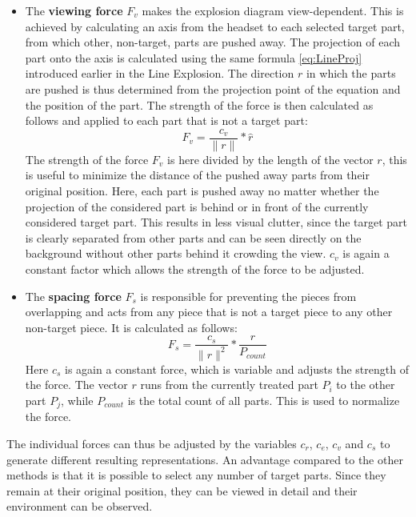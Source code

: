 \begin{itemize}
	\item The \textbf{viewing force} $F_v$ makes the explosion diagram view-dependent. 
	This is achieved by calculating an axis from the headset to each selected target part, from which other, non-target, parts are pushed away. 
	The projection of each part onto the axis is calculated using the same formula \ref{eq:LineProj} introduced earlier in the Line Explosion.
	The direction $r$ in which the parts are pushed is thus determined from the projection point of the equation and the position of the part. 
	The strength of the force is then calculated as follows and applied to each part that is not a target part:
	\begin{equation}
		F_v = \frac{c_v}{\|r\|} * \hat{r}
		\label{eq:FB_viewingForce}
	\end{equation}
	The strength of the force $F_v$ is here divided by the length of the vector $r$, this is useful to minimize the distance of the pushed away parts from their original position. 
	Here, each part is pushed away no matter whether the projection of the considered part is behind or in front of the currently considered target part. 
	This results in less visual clutter, since the target part is clearly separated from other parts and can be seen directly on the background without other parts behind it crowding the view. 
	$c_v$ is again a constant factor which allows the strength of the force to be adjusted.
	\item The \textbf{spacing force} $F_s$ is responsible for preventing the pieces from overlapping and acts from any piece that is not a target piece to any other non-target piece. It is calculated as follows:
	\begin{equation}
	F_s = \frac{c_s}{\|r\|^2} * \frac{r}{P_{count}}
	\label{eq:FB_spacingForce}
	\end{equation}
	Here $c_s$ is again a constant force, which is variable and adjusts the strength of the force. 
	The vector $r$ runs from the currently treated part $P_i$ to the other part $P_j$, while $P_{count}$ is the total count of all parts. 
	This is used to normalize the force. 
\end{itemize}
The individual forces can thus be adjusted by the variables $c_r$, $c_e$, $c_v$ and $c_s$ to generate different resulting representations. 
An advantage compared to the other methods is that it is possible to select any number of target parts. Since they remain at their original position, they can be viewed in detail and their environment can be observed.   


